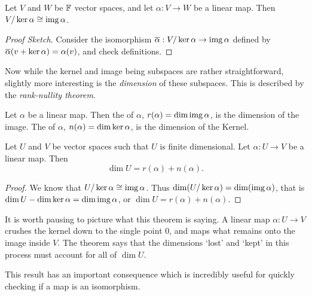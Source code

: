 \documentclass[a4paper]{scrartcl}
\begin{document}
\begin{theorem}
    Let $V$ and $W$ be $\mathbb{F}$ vector spaces, and let $\alpha: V \rightarrow W$ be a linear map. Then $V/\operatorname{ker} \alpha \cong \operatorname{img} \alpha$.
\end{theorem}
\begin{proof}[Proof Sketch]
    Consider the isomorphism $\overline{\alpha} : V/\operatorname{ker} \alpha \rightarrow \operatorname{img} \alpha$ defined by $\overline{\alpha}(v + \operatorname{ker} \alpha) = \alpha(v)$, and check definitions.
\end{proof}

Now while the kernel and image being subspaces are rather straightforward, slightly more interesting is the \emph{dimension} of these subspaces. This is described by the \emph{rank-nullity theorem}.

\begin{definition}
    Let $\alpha$ be a linear map. Then the  of $\alpha$, $r(\alpha) = \dim \operatorname{img} \alpha$, is the dimension of the image. The  of $\alpha$, $n(\alpha) = \dim \operatorname{ker} \alpha$, is the dimension of the Kernel.
\end{definition}

\begin{theorem}
    Let $U$ and $V$ be vector spaces such that $U$ is finite dimensional.
    Let $\alpha: U \rightarrow V$ be a linear map. Then
    $$
    \dim U = r(\alpha) + n(\alpha).
    $$
\end{theorem}
\begin{proof}
    We know that $U/\operatorname{ker} \alpha \cong \operatorname{img} \alpha$. Thus $\dim (U / \operatorname{ker} \alpha) = \dim (\operatorname{img} \alpha)$, that is $\dim U - \dim \operatorname{ker} \alpha = \dim \operatorname{img} \alpha$, or $\dim U = r(\alpha) + n(\alpha)$.
\end{proof}

It is worth pausing to picture what this theorem is saying. A linear map $\alpha: U \rightarrow V$ crushes the kernel down to the single point $0$, and maps what remains onto the image inside $V$. The theorem says that the dimensions `lost' and `kept' in this process must account for all of $\dim U$.
\begin{center}
\end{center}
This result has an important consequence which is incredibly useful for quickly checking if a map is an isomorphism.
\end{document}
